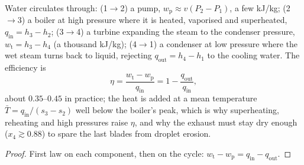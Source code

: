 \begin{proposition}\label{prop:b2:open-systems:rankine}
Water circulates through: (1$\to$2) a pump, $w_{\text{p}} \approx v(P_2 -
P_1)$, a few \unit{kJ/kg}; (2$\to$3) a boiler at high pressure where it
is heated, vaporised and superheated, $q_{\text{in}} = h_3 - h_2$;
(3$\to$4) a turbine expanding the steam to the condenser pressure,
$w_{\text{t}} = h_3 - h_4$ (a thousand \unit{kJ/kg}); (4$\to$1) a condenser
at low pressure where the wet steam turns back to liquid, rejecting
$q_{\text{out}} = h_4 - h_1$ to the cooling water. The efficiency is
\[
\eta = \frac{w_{\text{t}} - w_{\text{p}}}{q_{\text{in}}} = 1 - \frac{q_{\text{out}}}{q_{\text{in}}} ,
\]
about $0.35$--$0.45$ in practice; the heat is added at a mean
temperature $\bar T = q_{\text{in}}/(s_3 - s_2)$ well below the boiler's
peak, which is why superheating, reheating and high pressures raise
$\eta$, and why the exhaust must stay dry enough ($x_4 \gtrsim 0.88$) to
spare the last blades from droplet erosion.
\end{proposition}

\begin{proof}
First law on each component, then on the cycle: $w_{\text{t}} - w_{\text{p}}
= q_{\text{in}} - q_{\text{out}}$.
\end{proof}

